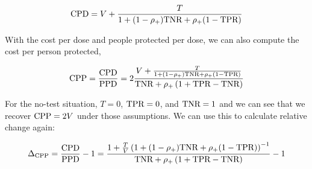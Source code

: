 \documentclass{article}
\begin{document}
$$
\textrm{CPD} = V + \frac{T}{1+(1-\rho_{{+}})\textrm{TNR} + \rho_{{+}}(1-\textrm{TPR})} 
$$

With the cost per dose and people protected per dose, we can also compute the cost per person protected,

$$
\textrm{CPP} = \frac{\textrm{CPD}}{\textrm{PPD}} = 2\frac{V + \frac{T}{1+(1-\rho_{{+}})\textrm{TNR} + \rho_{{+}}(1-\textrm{TPR})}}{\textrm{TNR} + \rho_{{+}} \left(1 + \textrm{TPR}-\textrm{TNR}\right)}
$$

For the no-test situation, $T=0$, $\textrm{TPR}=0$, and $\textrm{TNR}=1$ and we can see that we recover $\textrm{CPP}=2V$ under those assumptions. We can use this to calculate relative change again:

$$
\Delta_{\textrm{CPP}} = \frac{\textrm{CPD}}{\textrm{PPD}}-1 =\frac{1 + \frac{T}{V}\left(1+(1-\rho_{{+}})\textrm{TNR} + \rho_{{+}}(1-\textrm{TPR})\right)^{-1}}{\textrm{TNR} + \rho_{{+}} \left(1 + \textrm{TPR}-\textrm{TNR}\right)} - 1
$$
\end{document}
